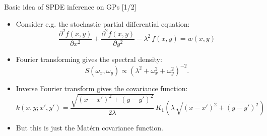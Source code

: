 \documentclass[first=dgreen,second=purple,presentation]{elecslides}
\begin{document}
\begin{frame}{Basic idea of SPDE inference on GPs [1/2]}

\begin{itemize}[<+->]
\item Consider e.g. the \alert{stochastic partial differential equation}:
\begin{equation}
  \frac{\partial^2 f(x,y)}{\partial x^2}
  + \frac{\partial^2 f(x,y)}{\partial y^2} -\lambda^2 \, f(x,y)
  = w(x,y)
\nonumber
\end{equation}

\item Fourier transforming gives the \alert{spectral density}:
%
\begin{equation}
  S(\omega_x,\omega_y)  \propto 
     \left( \lambda^2 + \omega_x^2 + \omega_y^2 \right)^{-2}. 
\nonumber
\end{equation}
%
\item Inverse Fourier transform gives the \alert{covariance function}:
{\small
\begin{equation}
  k(x,y;x',y')
  = \frac{\sqrt{(x-x')^2 + (y-y')^2}}{2\lambda} \, 
  K_1(\lambda \, \sqrt{(x-x')^2 + (y-y')^2})
\nonumber
\end{equation}
}

\item But this is just the \alert{Mat\'ern covariance function}.


\end{itemize}

\end{frame}
\end{document}
